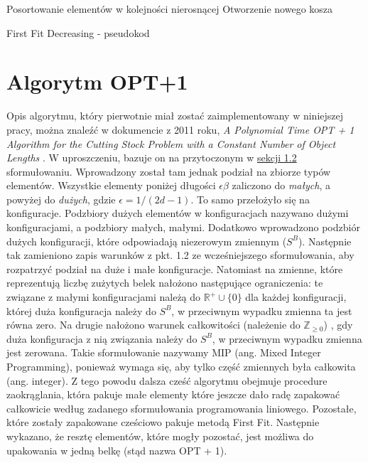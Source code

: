 \begin{algorithm}[H]
	Posortowanie elementów w kolejności nierosnącej \;
	Otworzenie nowego kosza \;
	
	\caption{First Fit Decreasing - pseudokod}
\end{algorithm}


\section{Algorytm OPT+1}
Opis algorytmu, który pierwotnie miał zostać zaimplementowany w niniejszej pracy, można znaleźć w dokumencie z 2011 roku, \textit{A Polynomial Time OPT + 1 Algorithm for the Cutting Stock Problem with a Constant Number of Object Lengths} \cite{ALG_OPT_1}. 
W uproszczeniu, bazuje on na przytoczonym w 
\hyperlink{section.1.2}{sekcji 1.2} sformułowaniu.
Wprowadzony został tam jednak podział na zbiorze typów elementów. 
Wszystkie elementy poniżej długości $\epsilon\beta$ zaliczono do \textit{małych}, a powyżej do \textit{dużych}, gdzie $\epsilon = 1/(2d-1)$. To samo przełożyło się na konfiguracje. Podzbiory dużych elementów w konfiguracjach nazywano dużymi konfiguracjami, a podzbiory małych, małymi. Dodatkowo wprowadzono podzbiór dużych konfiguracji, które odpowiadają niezerowym zmiennym ($S^B$). Następnie tak zamieniono zapis warunków z pkt. 1.2 ze wcześniejszego sformułowania, aby rozpatrzyć podział na duże i małe konfiguracje. Natomiast na zmienne, które reprezentują liczbę zużytych belek nałożono następujące ograniczenia: te związane z małymi konfiguracjami należą do $\mathbb{R}^+\cup \{0\}$ dla każdej konfiguracji, której duża konfiguracja należy do $S^B$, w przeciwnym wypadku zmienna ta jest równa zero. Na drugie nałożono warunek całkowitości (należenie do $\mathbb{Z}_{\geq 0}$) , gdy duża konfiguracja z nią związania należy do $S^B$, w przeciwnym wypadku zmienna jest zerowana.
Takie sformułowanie nazywamy MIP (ang. Mixed Integer Programming), ponieważ wymaga się, aby tylko część zmiennych była całkowita (ang. integer).
Z tego powodu dalsza cześć algorytmu obejmuje procedure zaokrąglania, która pakuje małe elementy które jeszcze dało radę zapakować całkowicie według zadanego sformułowania programowania liniowego. Pozostałe, które zostały zapakowane cześciowo pakuje metodą First Fit. Następnie wykazano, że resztę elementów, które mogły pozostać, jest możliwa do upakowania w jedną belkę (stąd nazwa OPT + 1). \\

